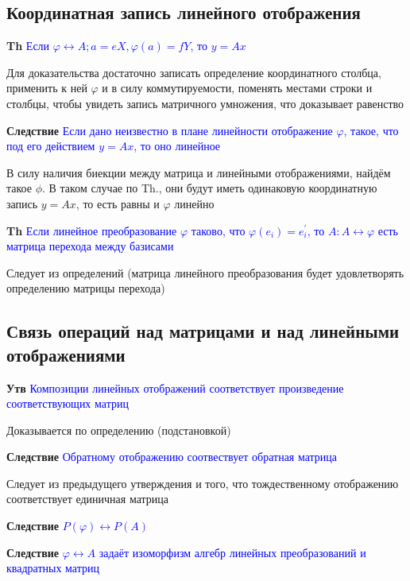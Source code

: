 \documentclass[a4paper, 14pt]{article}
\begin{document}
      \subsection{Координатная запись линейного отображения}

    \textbf{Th} \textcolor{blue}{Если $\varphi \leftrightarrow A; a = eX, \varphi(a) = fY$, то $y = Ax$}

    Для доказательства достаточно записать определение координатного столбца, применить к ней $\varphi$ и в силу
    коммутируемости, поменять местами строки и столбцы, чтобы увидеть запись матричного умножения, что доказывает
    равенство

    \textbf{Следствие} \textcolor{blue}{Если дано неизвестно в плане линейности отображение $\varphi$, такое, что под
    его действием $y = Ax$, то оно линейное}

    В силу наличия биекции между матрица и линейными отображениями, найдём такое $\phi$.
    В таком случае по Th., они будут иметь одинаковую координатную запись $y = Ax$, то есть равны и $\varphi$ линейно

    \textbf{Th} \textcolor{blue}{Если линейное преобразование $\varphi$ таково, что $\varphi(e_i) = e_i^{'}$, то
        $A: A \leftrightarrow \varphi$ есть матрица перехода между базисами}

    Следует из определений (матрица линейного преобразования будет удовлетворять определению матрицы перехода)

    \subsection{Связь операций над матрицами и над линейными отображениями}

    \textbf{Утв} \textcolor{blue}{Композиции линейных отображений соответствует произведение соответствующих матриц}

    Доказывается по определению (подстановкой)

    \textbf{Следствие} \textcolor{blue}{Обратному отображению соотвествует обратная матрица}

    Следует из предыдущего утверждения и того, что тождественному отображению соответствует единичная матрица

    \textbf{Следствие} \textcolor{blue}{$P(\varphi) \leftrightarrow P(A)$}

    \textbf{Следствие} \textcolor{blue}{$\varphi \leftrightarrow A$ задаёт изоморфизм алгебр линейных преобразований
    и квадратных матриц}
\end{document}
